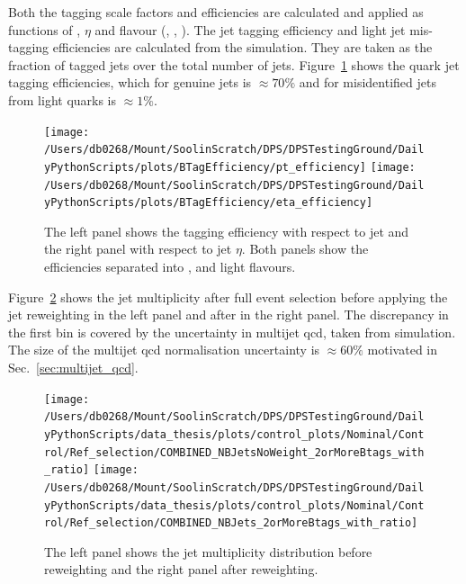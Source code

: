 Both the \bquark{} tagging scale factors and efficiencies are calculated and applied as functions of \pt{}, $\eta$ and flavour (\bquark{}, \cquark{}, \udsg{}).
The \bquark{} jet tagging efficiency and light jet mis-tagging efficiencies are calculated from the \powhegpythia{} \ttbar{} simulation.
They are taken as the fraction of tagged jets over the total number of \bquark{} jets.
Figure~\ref{fig:BTag} shows the \bquark{} quark jet tagging efficiencies, which for genuine \bquark{} jets is $\approx70\%$ and for misidentified jets from light quarks is $\approx1\%$.
\begin{figure}[htpb]
	\centering
	\texttt{[image: /Users/db0268/Mount/SoolinScratch/DPS/DPSTestingGround/DailyPythonScripts/plots/BTagEfficiency/pt\_efficiency]}
	\texttt{[image: /Users/db0268/Mount/SoolinScratch/DPS/DPSTestingGround/DailyPythonScripts/plots/BTagEfficiency/eta\_efficiency]}
	\caption[The left panel shows the \bquark{} tagging efficiency with respect to jet \pt{} and the right panel with respect to jet $\eta$. Both panels show the efficiencies separated into \bquark{}, \cquark{} and light flavours.]{The left panel shows the \bquark{} tagging efficiency with respect to jet \pt{} and the right panel with respect to jet $\eta$. Both panels show the efficiencies separated into \bquark{}, \cquark{} and light flavours.}
	\label{fig:BTag}
\end{figure}

Figure~\ref{fig:BWeight} shows the \bquark{} jet multiplicity after full event selection before applying the \bquark{} jet reweighting in the left panel and after in the right panel.
The discrepancy in the first bin is covered by the uncertainty in multijet \acrshort{qcd}, taken from simulation.
The size of the multijet \acrshort{qcd} normalisation uncertainty is $\approx60\%$ motivated in Sec.~\ref{sec:multijet_qcd}.
\begin{figure}[htpb]
	\centering
	\texttt{[image: /Users/db0268/Mount/SoolinScratch/DPS/DPSTestingGround/DailyPythonScripts/data\_thesis/plots/control\_plots/Nominal/Control/Ref\_selection/COMBINED\_NBJetsNoWeight\_2orMoreBtags\_with\_ratio]}
	\texttt{[image: /Users/db0268/Mount/SoolinScratch/DPS/DPSTestingGround/DailyPythonScripts/data\_thesis/plots/control\_plots/Nominal/Control/Ref\_selection/COMBINED\_NBJets\_2orMoreBtags\_with\_ratio]}	
	\caption[The left panel shows the \bquark{} jet multiplicity distribution before reweighting and the right panel after reweighting.]{The left panel shows the \bquark{} jet multiplicity distribution before reweighting and the right panel after reweighting.}
	\label{fig:BWeight}
\end{figure}

